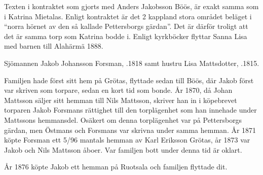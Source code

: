 Texten i kontraktet som gjorts med Anders Jakobsson Böös, är exakt samma som i Katrina Mietalas. Enligt kontraktet är det 2 kappland stora området beläget i ``norra hörnet av den så kallade Pettersborgs gärdan''. Det är därför troligt att det är samma torp som Katrina bodde i. Enligt kyrkböcker flyttar Sanna Lisa med barnen till Alahärmä 1888.
\begin{jhchildren}
  \item {}
  \item {}
  \item {}
\end{jhchildren}


%
Sjömannen Jakob Johansson Forsman, .1818 samt hustru Lisa Mattsdotter, .1815.
\begin{jhchildren}
  \item {}
  \item {}
  \item {}
\end{jhchildren}
Familjen hade först sitt hem på Grötas, flyttade sedan till Böös, där Jakob först var skriven som torpare, sedan en kort tid som bonde. År 1870, då Johan Mattsson säljer sitt hemman till Nils Mattsson, skriver han in i köpebrevet torparen Jakob Forsmans rättighet till den torplägenhet som han innehade under Mattssons hemmansdel. Osäkert om denna torplägenhet var på Pettersborgs gärdan, men Östmans och Forsmans var skrivna under samma hemman. År 1871 köpte Forsman ett 5/96 mantals hemman av Karl Eriksson Grötas, år 1873 var Jakob och Nils Mattsson åboer. Var familjen bott under denna tid är oklart.

År 1876 köpte Jakob ett hemman på Ruotsala och familjen flyttade dit.



%



